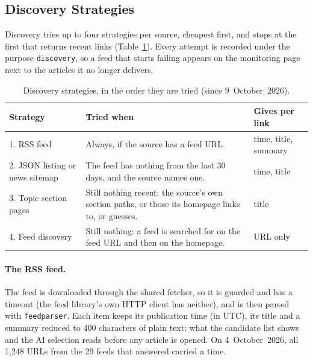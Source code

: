 
\subsection{Discovery Strategies}
\label{subsec:scraping-discovery}

Discovery tries up to four strategies per source, cheapest first, and
stops at the first that returns recent links
(Table~\ref{tab:discovery-strategies}). Every attempt is recorded under
the purpose \texttt{discovery}, so a feed that starts failing appears
on the monitoring page next to the articles it no longer delivers.

\begin{table}[ht]
\centering
\small
\caption{Discovery strategies, in the order they are tried (since
9~October~2026).}
\label{tab:discovery-strategies}
\begin{tabularx}{\linewidth}{@{}lXl@{}}
\toprule
Strategy & Tried when & Gives per link \\
\midrule
1. RSS feed              & Always, if the source has a feed URL.
                         & time, title, summary \\
2. JSON listing or news sitemap & The feed has nothing from the last
                           30 days, and the source names one.
                         & time, title \\
3. Topic section pages   & Still nothing recent: the source's own
                           section paths, or those its homepage links
                           to, or guesses.
                         & title \\
4. Feed discovery        & Still nothing: a feed is searched for on the
                           feed URL and then on the homepage.
                         & URL only \\
\bottomrule
\end{tabularx}
\end{table}

\paragraph{The RSS feed.} The feed is downloaded through the shared
fetcher, so it is guarded and has a timeout (the feed library's own
HTTP client has neither), and is then parsed with \texttt{feedparser}.
Each item keeps its publication time (in UTC), its title and a summary
reduced to 400 characters of plain text: what the candidate list shows
and the AI selection reads before any article is opened. On
4~October~2026, all 1,248 URLs from the 29 feeds that answered carried
a time.

